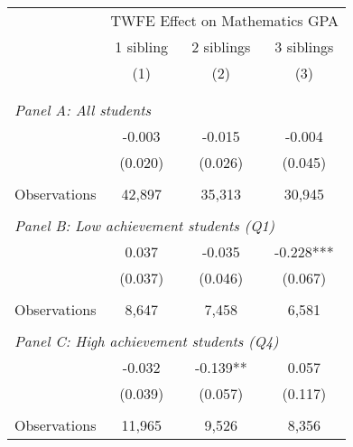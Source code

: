 \makeatletter
{}
{
\makeatother
\begin{tabular}{lccc}
\toprule
\cmidrule(lr){2-4}
& \multicolumn{3}{c}{TWFE Effect on Mathematics GPA} \\
\cmidrule(lr){2-4}
& 1 sibling & 2 siblings & 3 siblings  \\
\cmidrule(lr){2-2} \cmidrule(lr){3-3} \cmidrule(lr){4-4}
& (1) & (2) & (3)\\
\bottomrule
&  &  &  \\
&  &  &   \\
\multicolumn{4}{l}{\textit{Panel A: All students}} \\
\hspace{3mm}        &      -0.003   &      -0.015   &      -0.004   \\
                    &     (0.020)   &     (0.026)   &     (0.045)   \\
                    &               &               &               \\
\hspace{3mm}Observations&      42,897   &      35,313   &      30,945   \\
 
&  &  &   \\
\multicolumn{4}{l}{\textit{Panel B: Low achievement students (Q1)}} \\
\hspace{3mm}        &       0.037   &      -0.035   &      -0.228***\\
                    &     (0.037)   &     (0.046)   &     (0.067)   \\
                    &               &               &               \\
\hspace{3mm}Observations&       8,647   &       7,458   &       6,581   \\
 
&  &  &   \\
\multicolumn{4}{l}{\textit{Panel C: High achievement students (Q4)}} \\
\hspace{3mm}        &      -0.032   &      -0.139** &       0.057   \\
                    &     (0.039)   &     (0.057)   &     (0.117)   \\
                    &               &               &               \\
\hspace{3mm}Observations&      11,965   &       9,526   &       8,356   \\
 

\end{tabular}}
